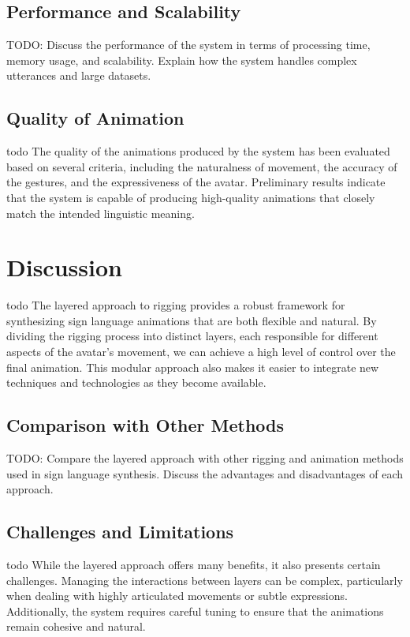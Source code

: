 \documentclass[../../main.tex]{subfiles}
\begin{document}
\subsection{Performance and Scalability}
TODO: Discuss the performance of the system in terms of processing time, memory usage, and scalability. Explain how the system handles complex utterances and large datasets.

\subsection{Quality of Animation}
todo The quality of the animations produced by the system has been evaluated based on several criteria, including the naturalness of movement, the accuracy of the gestures, and the expressiveness of the avatar. Preliminary results indicate that the system is capable of producing high-quality animations that closely match the intended linguistic meaning.

\section{Discussion}
todo The layered approach to rigging provides a robust framework for synthesizing sign language animations that are both flexible and natural. By dividing the rigging process into distinct layers, each responsible for different aspects of the avatar's movement, we can achieve a high level of control over the final animation. This modular approach also makes it easier to integrate new techniques and technologies as they become available.

\subsection{Comparison with Other Methods}
TODO: Compare the layered approach with other rigging and animation methods used in sign language synthesis. Discuss the advantages and disadvantages of each approach.

\subsection{Challenges and Limitations}
todo While the layered approach offers many benefits, it also presents certain challenges. Managing the interactions between layers can be complex, particularly when dealing with highly articulated movements or subtle expressions. Additionally, the system requires careful tuning to ensure that the animations remain cohesive and natural.
\end{document}
